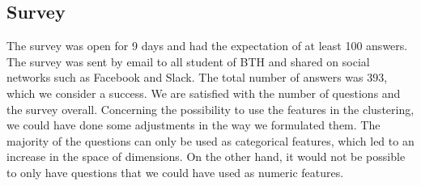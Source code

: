 \documentclass[a4paper]{article}
\begin{document}
\subsection{Survey}
The survey was open for 9 days and had the expectation of at least 100 answers. The survey was sent by email to all student of BTH and shared on social networks such as Facebook and Slack. The total number of answers was 393, which we consider a success. We are satisfied with the number of questions and the survey overall. Concerning the possibility to use the features in the clustering, we could have done some adjustments in the way we formulated them. The majority of the questions can only be used as categorical features, which led to an increase in the space of dimensions. On the other hand, it would not be possible to only have questions that we could have used as numeric features. \\
\end{document}
